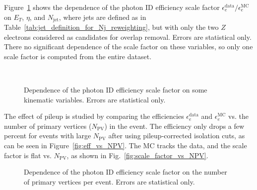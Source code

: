 \documentclass[dissertation.tex]{subfiles}
\begin{document}
Figure~\ref{fig:scale_factors} shows the dependence of the photon ID efficiency scale factor $\epsilon_{e}^{\mathrm{data}}/\epsilon_{e}^{\mathrm{MC}}$ on $E_{T}$, $\eta$, and $N_{\mathrm{jet}}$, where jets are defined as in Table~\ref{tab:jet_definition_for_Nj_reweighting}, but with only the two $Z$ electrons considered as candidates for overlap removal.  Errors are statistical only.  There no significant dependence of the scale factor on these variables, so only one scale factor is computed from the entire dataset.

\begin{figure}
	\centering
	\hspace{1cm}
	\\
	\caption{Dependence of the photon ID efficiency scale factor on some kinematic variables.  Errors are statistical only.}
	\label{fig:scale_factors}
\end{figure}

The effect of pileup is studied by comparing the efficiencies $\epsilon_{e}^{\mathrm{data}}$ and $\epsilon_{e}^{\mathrm{MC}}$ vs. the number of primary vertices ($N_{\mathrm{PV}}$) in the event.  The efficiency only drops a few percent for events with large $N_{\mathrm{PV}}$ after using pileup-corrected isolation cuts, as can be seen in Figure~\ref{fig:eff_vs_NPV}.  The MC tracks the data, and the scale factor is flat vs. $N_{\mathrm{PV}}$, as shown in Fig.~\ref{fig:scale_factor_vs_NPV}.

\begin{figure}
	\centering
	\hspace{1cm}
	\caption{Dependence of the photon ID efficiency scale factor on the number of primary vertices per event.  Errors are statistical only.}
	\label{fig:vs_NPV}
\end{figure}
\end{document}
